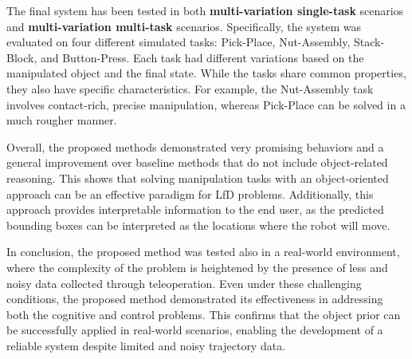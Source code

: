 The final system has been tested in both \textbf{multi-variation single-task} scenarios and \textbf{multi-variation multi-task} scenarios. Specifically, the system was evaluated on four different   simulated tasks: Pick-Place, Nut-Assembly, Stack-Block, and Button-Press. Each task had different variations based on the manipulated object and the final state. While the tasks share common properties, they also have specific characteristics. For example, the Nut-Assembly task involves contact-rich, precise manipulation, whereas Pick-Place can be solved in a much rougher manner.

Overall, the proposed methods demonstrated very promising behaviors and a general improvement over baseline methods that do not include object-related reasoning. This shows that solving manipulation tasks with an object-oriented approach can be an effective paradigm for LfD problems. Additionally, this approach provides interpretable information to the end user, as the predicted bounding boxes can be interpreted as the locations where the robot will move.

In conclusion, the proposed method was tested also in a real-world environment, where the complexity of the problem is heightened by the presence of less and noisy data collected through teleoperation. Even under these challenging conditions, the proposed method demonstrated its effectiveness in addressing both the cognitive and control problems. This confirms that the object prior can be successfully applied in real-world scenarios, enabling the development of a reliable system despite limited and noisy trajectory data.
